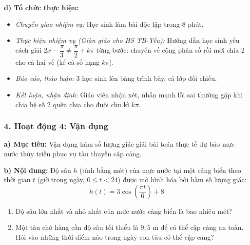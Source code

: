 \documentclass[12pt, a4paper]{article}
\begin{document}
\textbf{d) Tổ chức thực hiện:}
\begin{itemize}[leftmargin=0.6cm]
    \item \textit{Chuyển giao nhiệm vụ:} Học sinh làm bài độc lập trong 8 phút.
    \item \textit{Thực hiện nhiệm vụ (Giàn giáo cho HS TB-Yếu):} Hướng dẫn học sinh yếu cách giải $2x - \dfrac{\pi}{3} \neq \dfrac{\pi}{2} + k\pi$ từng bước: chuyển vế cộng phân số rồi mới chia 2 cho cả hai vế (kể cả số hạng $k\pi$).
    \item \textit{Báo cáo, thảo luận:} 3 học sinh lên bảng trình bày, cả lớp đối chiếu.
    \item \textit{Kết luận, nhận định:} Giáo viên nhận xét, nhấn mạnh lỗi sai thường gặp khi chia hệ số $2$ quên chia cho đuôi chu kì $k\pi$.
\end{itemize}

\subsubsection*{4. Hoạt động 4: Vận dụng}
\textbf{a) Mục tiêu:} Vận dụng hàm số lượng giác giải bài toán thực tế dự báo mực nước thủy triều phục vụ tàu thuyền cập cảng.

\textbf{b) Nội dung:}
Độ sâu $h$ (tính bằng mét) của mực nước tại một cảng biển theo thời gian $t$ (giờ trong ngày, $0 \le t < 24$) được mô hình hóa bởi hàm số lượng giác:
$$h(t) = 3\cos\left(\dfrac{\pi t}{6}\right) + 8$$
\begin{enumerate}[leftmargin=0.5cm]
    \item Độ sâu lớn nhất và nhỏ nhất của mực nước cảng biển là bao nhiêu mét?
    \item Một tàu chở hàng cần độ sâu tối thiểu là $9{,}5\text{ m}$ để có thể cập cảng an toàn. Hỏi vào những thời điểm nào trong ngày con tàu có thể cập cảng?
\end{enumerate}
\end{document}
